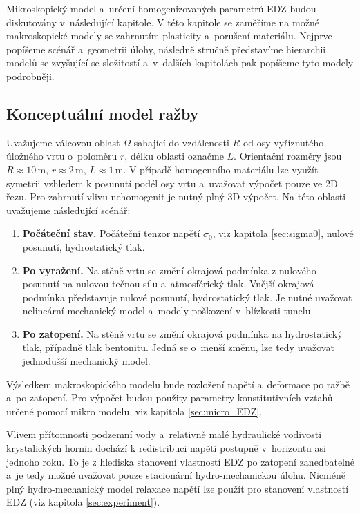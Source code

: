 \documentclass{article}
\begin{document}
Mikroskopický model a~určení homogenizovaných parametrů EDZ budou diskutovány v~následující kapitole.
V této kapitole se zaměříme na možné makroskopické modely se zahrnutím plasticity a~porušení materiálu.
Nejprve popíšeme scénář a~geometrii úlohy, následně stručně představíme hierarchii modelů se zvyšující se složitostí
a~v~dalších kapitolách pak popíšeme tyto modely podrobněji.

\subsection{Konceptuální model ražby}
Uvažujeme válcovou oblast $\Omega$ sahající do vzdálenosti $R$ od osy vyříznutého úložného vrtu o~poloměru $r$, délku oblasti označme $L$. Orientační rozměry jsou $R\approx 10\,\mathrm{m}$, $r\approx 2\,\mathrm{m}$, $L\approx 1\,\mathrm{m}$. V případě homogenního materiálu lze využít symetrii vzhledem k posunutí podél osy vrtu a~uvažovat výpočet pouze ve 2D řezu. Pro zahrnutí vlivu nehomogenit je nutný plný 3D výpočet. Na této oblasti uvažujeme následující scénář:

\begin{enumerate}
\item {\bf Počáteční stav.} Počáteční tenzor napětí $\sigma_0$, viz kapitola \ref{sec:sigma0}, nulové posunutí, hydrostatický tlak.
                       
\item {\bf Po vyražení.} Na stěně vrtu se změní okrajová podmínka z nulového posunutí na nulovou tečnou sílu
                         a~atmosférický tlak. Vnější okrajová podmínka představuje nulové posunutí, hydrostatický tlak.
                         Je nutné uvažovat nelineární mechanický model a~modely poškození v~blízkosti tunelu.                    
                         
\item {\bf Po zatopení.} Na stěně vrtu se změní okrajová podmínka na hydrostatický tlak, případně tlak bentonitu. 
                        Jedná se o~menší změnu, lze tedy uvažovat jednodušší mechanický model.
\end{enumerate}

Výsledkem makroskopického modelu bude rozložení napětí a~deformace po ražbě a~po zatopení. Pro výpočet budou použity 
parametry konstitutivních vztahů určené pomocí mikro modelu, viz kapitola \ref{sec:micro_EDZ}. 

Vlivem přítomnosti podzemní vody a~relativně malé hydraulické vodivosti krystalických hornin dochází k redistribuci napětí 
postupně v~horizontu asi jednoho roku. To je z hlediska stanovení vlastností EDZ po zatopení zanedbatelné a~je tedy možné uvažovat 
pouze stacionární hydro-mechanickou úlohu. Nicméně plný hydro-mechanický model relaxace napětí lze použít pro stanovení vlastností EDZ (viz kapitola \ref{sec:experiment}).
\end{document}

